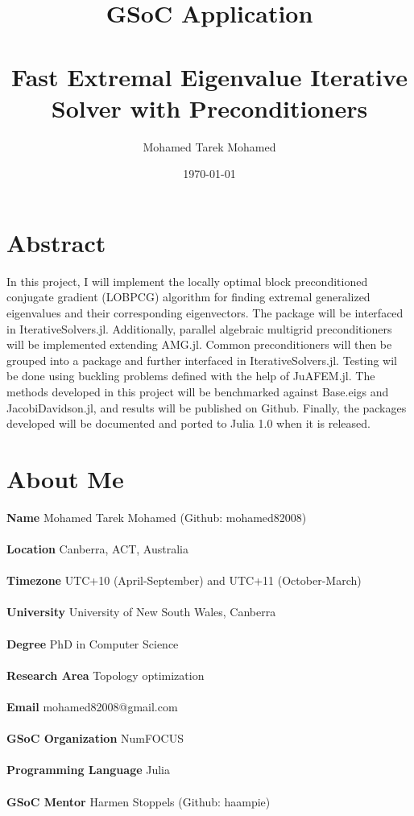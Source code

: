 \documentclass[12pt]{article}
\begin{document}
\begin{titlepage}
\title{
	\textbf{GSoC Application} \\~\\
	Fast Extremal Eigenvalue Iterative Solver with Preconditioners\\
}
\author{Mohamed Tarek Mohamed}
\date{\today}
\maketitle
\thispagestyle{empty}
\tableofcontents
\end{titlepage}

\section{Abstract}

In this project, I will implement the locally optimal block preconditioned conjugate gradient (LOBPCG) algorithm for finding extremal generalized eigenvalues and their corresponding eigenvectors. The package will be interfaced in IterativeSolvers.jl. Additionally, parallel algebraic multigrid preconditioners will be implemented extending AMG.jl. Common preconditioners will then be grouped into a package and further interfaced in IterativeSolvers.jl. Testing wil be done using buckling problems defined with the help of JuAFEM.jl. The methods developed in this project will be benchmarked against Base.eigs and JacobiDavidson.jl, and results will be published on Github. Finally, the packages developed will be documented and ported to Julia 1.0 when it is released.

\section{About Me}

\bigskip
\bigskip
\textbf{Name} Mohamed Tarek Mohamed (Github: mohamed82008) \\~\\
\textbf{Location} Canberra, ACT, Australia \\~\\
\textbf{Timezone} UTC+10 (April-September) and UTC+11 (October-March) \\~\\
\textbf{University} University of New South Wales, Canberra \\~\\
\textbf{Degree} PhD in Computer Science \\~\\
\textbf{Research Area} Topology optimization \\~\\
\textbf{Email} mohamed82008@gmail.com \\~\\
\textbf{GSoC Organization} NumFOCUS \\~\\
\textbf{Programming Language} Julia \\~\\
\textbf{GSoC Mentor} Harmen Stoppels (Github: haampie) \\~\\
\end{document}
